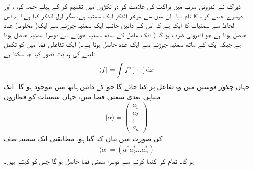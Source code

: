 ڈیراک نے اندرونی ضرب  میں براکٹ کی علامت کو دو ٹکڑوں میں تقسیم کر کے پہلے حصہ کو، ، اور دوسرے حصے کو ،  کا نام دیا۔ ان میں سے موخر الذکر ایک سمتیہ ہے، مگر اول الذکر کیا ہے؟ یہ اس لحاظ سے سمتیات کا ایک  ہے کہ اس کے دائیں جانب ایک سمتیہ جوڑنے سے ایک( مخلوط) عدد حاصل ہوتا ہے جو اندرونی ضرب ہو گا۔( ایک عامل کے ساتھ سمتیہ جوڑنے سے دوسرا سمتیہ حاصل ہوتا ہے جبکہ ایک  کے ساتھ سمتیہ جوڑنے سے ایک عدد حاصل ہوتا ہے۔) ایک تفاعلی فضا میں  کو تکمل لینے کی ہدایت تصور کیا جا سکتا ہے:
\begin{align*}
\langle f | = \int f^{*} [ \cdots ] \dif x
\end{align*}
جہاں چکور قوسین  میں وہ تفاعل پر کیا جائے گا جو  کے دائیں ہاتھ  میں موجود ہو گا۔ ایک متناہی بعدی سمتی فضا میں، جہاں سمتیات کو قطاروں 
\begin{align}
| \alpha \rangle = \begin{pmatrix}
a_{1} \\ a_{2} \\ \vdots \\ a_{n} 
\end{pmatrix}
\end{align}
کی صورت میں بیان کیا گیا ہو، مطابقتی  ایک سمتیہ صف 
\begin{align}
\langle \alpha | = ( a_{1}^{*}a_{2}^{*} \dotsc a_{n}^{*})
\end{align}
ہو گا۔ تمام  کو اکٹھا کرنے سے دوسرا سمتی فضا حاصل ہو گا جس کو کہتے ہیں۔ 


